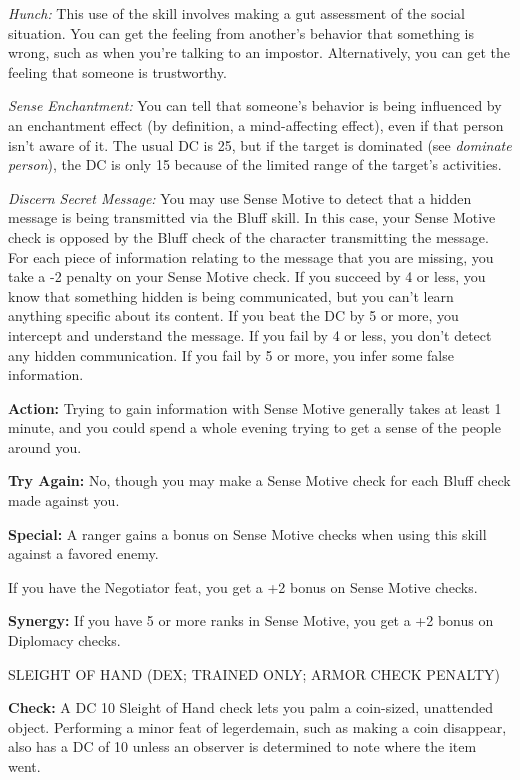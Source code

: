 \documentclass{article}
\begin{document}
\vspace{12pt}
\textit{Hunch: }This use of the skill involves making a gut assessment of the social 
situation. You can get the feeling from another's behavior that something is wrong, 
such as when you're talking to an impostor. Alternatively, you can get the feeling 
that someone is trustworthy.

\textit{Sense Enchantment: }You can tell that someone's behavior is being influenced 
by an enchantment effect (by definition, a mind-affecting effect),\textit{ }even 
if that person isn't aware of it. The usual DC is 25, but if the target is dominated 
(see \textit{dominate person}), the DC is only 15 because of the limited range 
of the target's activities.

\textit{Discern Secret Message: }You may use Sense Motive to detect that a hidden 
message is being transmitted via the Bluff skill. In this case, your Sense Motive 
check is opposed by the Bluff check of the character transmitting the message. 
For each piece of information relating to the message that you are missing, you 
take a -2 penalty on your Sense Motive check. If you succeed by 4 or less, you 
know that something hidden is being communicated, but you can't learn anything 
specific about its content. If you beat the DC by 5 or more, you intercept and 
understand the message. If you fail by 4 or less, you don't detect any hidden communication. 
If you fail by 5 or more, you infer some false information.

\textbf{Action:} Trying to gain information with Sense Motive generally takes at 
least 1 minute, and you could spend a whole evening trying to get a sense of the 
people around you.

\textbf{Try Again:} No, though you may make a Sense Motive check for each Bluff 
check made against you.

\textbf{Special:} A ranger gains a bonus on Sense Motive checks when using this 
skill against a favored enemy.

If you have the Negotiator feat, you get a +2 bonus on Sense Motive checks.

\textbf{Synergy:} If you have 5 or more ranks in Sense Motive, you get a +2 bonus 
on Diplomacy checks.

\vspace{12pt}
SLEIGHT OF HAND (DEX; TRAINED ONLY; ARMOR CHECK PENALTY)

\textbf{Check:} A DC 10 Sleight of Hand check lets you palm a coin-sized, unattended 
object. Performing a minor feat of legerdemain, such as making a coin disappear, 
also has a DC of 10 unless an observer is determined to note where the item went.
\end{document}
